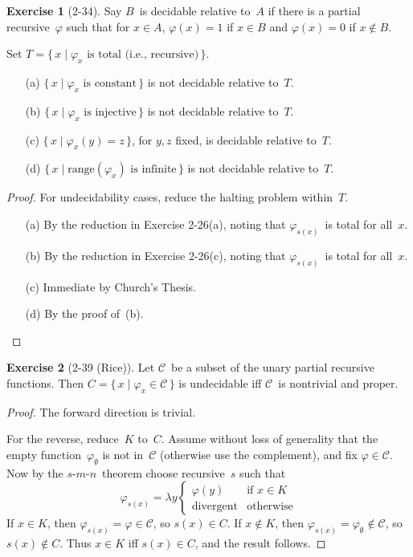 \documentclass[letterpaper]{article}
\newcommand{\C}{\mathcal{C}}
\newcommand{\ran}{\mathrm{range}}
\newcommand{\smn}{$s$-$m$-$n$}
\theoremstyle{definition}
\newtheorem*{exer}{Exercise}
\theoremstyle{remark}
\theoremstyle{direction}
\begin{document}
\begin{exer}[2-34]
Say $B$~is decidable relative to~$A$ if there is a partial recursive~$\varphi$ such that for $x\in A$, $\varphi(x)=1$ if $x\in B$ and $\varphi(x)=0$ if $x\not\in B$.

Set $T=\{\,x\mid\varphi_x\text{ is total (i.e., recursive)}\,\}$.
\begin{enumerate}[itemsep=0pt]
\item[(a)] $\{\,x\mid\varphi_x\text{ is constant}\,\}$ is not decidable relative to~$T$.
\item[(b)] $\{\,x\mid\varphi_x\text{ is injective}\,\}$ is not decidable relative to~$T$.
\item[(c)] $\{\,x\mid\varphi_x(y)=z\,\}$, for $y,z$ fixed, is decidable relative to~$T$.
\item[(d)] $\{\,x\mid\ran(\varphi_x)\text{ is infinite}\,\}$ is not decidable relative to~$T$.
\end{enumerate}
\end{exer}
\begin{proof}
For undecidability cases, reduce the halting problem within~$T$.
\begin{enumerate}[itemsep=0pt]
\item[(a)] By the reduction in Exercise 2-26(a), noting that $\varphi_{s(x)}$~is total for all~$x$.
\item[(b)] By the reduction in Exercise 2-26(c), noting that $\varphi_{s(x)}$~is total for all~$x$.
\item[(c)] Immediate by Church's Thesis.
\item[(d)] By the proof of~(b).\qedhere
\end{enumerate}
\end{proof}

\begin{exer}[2-39 (Rice)]
Let $\C$~be a subset of the unary partial recursive functions. Then $C=\{\,x\mid\varphi_x\in\C\,\}$ is undecidable iff $\C$~is nontrivial and proper.
\end{exer}
\begin{proof}
The forward direction is trivial.

For the reverse, reduce~$K$ to~$C$. Assume without loss of generality that the empty function~$\varphi_{\emptyset}$ is not in~$\C$ (otherwise use the complement), and fix $\varphi\in\C$. Now by the \smn\ theorem choose recursive~$s$ such that
$$\varphi_{s(x)}=\lambda y\begin{cases}
\varphi(y)&\text{if }x\in K\\
\text{divergent}&\text{otherwise}
\end{cases}$$
If $x\in K$, then $\varphi_{s(x)}=\varphi\in\C$, so $s(x)\in C$. If $x\not\in K$, then $\varphi_{s(x)}=\varphi_{\emptyset}\not\in\C$, so $s(x)\not\in C$. Thus $x\in K$ iff $s(x)\in C$, and the result follows.
\end{proof}
\end{document}
